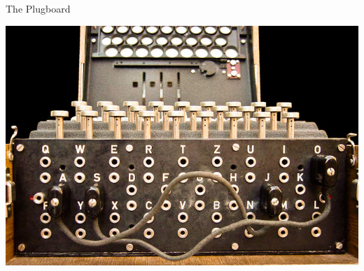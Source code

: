 \documentclass[hyphens,aspectratio=169]{beamer}
\begin{document}
\begin{frame}[fragile]{The Plugboard}
\begin{center}
    \includegraphics[]{paper/images/plugboard.jpg}
\end{center}
\end{frame}
\end{document}
